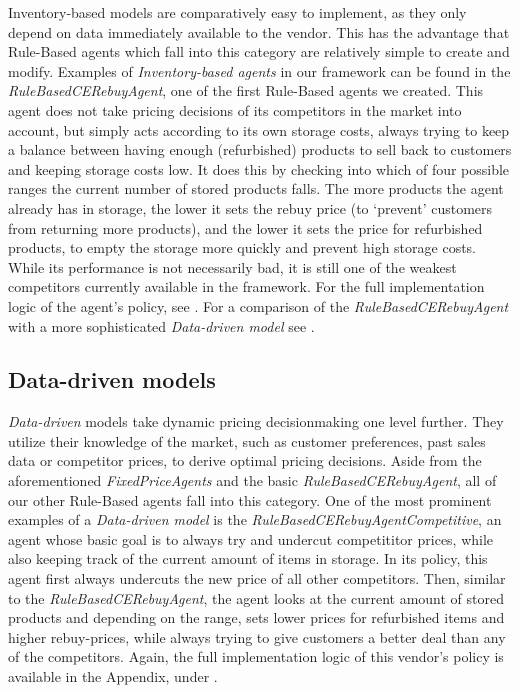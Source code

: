 Inventory-based models are comparatively easy to implement, as they only depend on data immediately available to the vendor. This has the advantage that Rule-Based agents which fall into this category are relatively simple to create and modify. Examples of \emph{Inventory-based agents} in our framework can be found in the \emph{RuleBasedCERebuyAgent}, one of the first Rule-Based agents we created. This agent does not take pricing decisions of its competitors in the market into account, but simply acts according to its own storage costs, always trying to keep a balance between having enough (refurbished) products to sell back to customers and keeping storage costs low. It does this by checking into which of four possible ranges the current number of stored products falls. The more products the agent already has in storage, the lower it sets the rebuy price (to `prevent' customers from returning more products), and the lower it sets the price for refurbished products, to empty the storage more quickly and prevent high storage costs. While its performance is not necessarily bad, it is still one of the weakest competitors currently available in the framework. For the full implementation logic of the agent's policy, see . For a comparison of the \emph{RuleBasedCERebuyAgent} with a more sophisticated \emph{Data-driven model} see .

\subsection*{Data-driven models}\label{subsec:DataDrivenModels}

\emph{Data-driven} models take dynamic pricing decisionmaking one level further. They utilize their knowledge of the market, such as customer preferences, past sales data or competitor prices, to derive optimal pricing decisions. Aside from the aforementioned \emph{FixedPriceAgents} and the basic \emph{RuleBasedCERebuyAgent}, all of our other Rule-Based agents fall into this category. One of the most prominent examples of a \emph{Data-driven model} is the \emph{RuleBasedCERebuyAgentCompetitive}, an agent whose basic goal is to always try and undercut competititor prices, while also keeping track of the current amount of items in storage. In its policy, this agent first always undercuts the new price of all other competitors. Then, similar to the \emph{RuleBasedCERebuyAgent}, the agent looks at the current amount of stored products and depending on the range, sets lower prices for refurbished items and higher rebuy-prices, while always trying to give customers a better deal than any of the competitors. Again, the full implementation logic of this vendor's policy is available in the Appendix, under .

